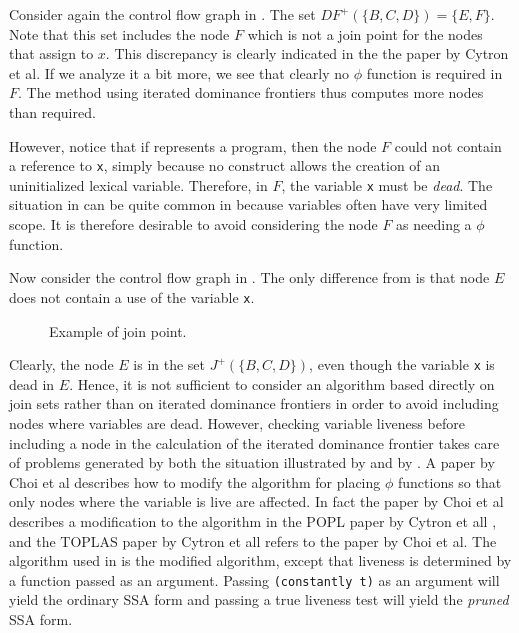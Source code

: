 Consider again the control flow graph in .  The
set $DF^+(\{B, C, D\}) = \{E, F\}$.  Note that this set includes the
node $F$ which is not a join point for the nodes that assign to $x$.
This discrepancy is clearly indicated in the the paper by Cytron et
al.  If we analyze it a bit more, we see that clearly no $\phi$
function is required in $F$.  The method using iterated dominance
frontiers thus computes more nodes than required.  

However, notice that if  represents a
\commonlisp{} program, then the node $F$ could not contain a reference
to \texttt{x}, simply because no \commonlisp{} construct allows the
creation of an uninitialized lexical variable.  Therefore, in $F$, the
variable \texttt{x} must be \emph{dead}.  The situation in
 can be quite common in \commonlisp{} because
variables often have very limited scope.  It is therefore desirable to
avoid considering the node $F$ as needing a $\phi$ function.

Now consider the control flow graph in .  The
only difference from  is that node $E$ does not
contain a use of the variable \texttt{x}.

\begin{figure}
\begin{center}
\end{center}
\caption{\label{fig-ssa-join-2}
Example of join point.}
\end{figure}

Clearly, the node $E$ is in the set $J^+(\{B, C, D\})$, even though
the variable \texttt{x} is dead in $E$.  Hence, it is not sufficient
to consider an algorithm based directly on join sets rather than on
iterated dominance frontiers in order to avoid including nodes where
variables are dead.  However, checking variable liveness before
including a node in the calculation of the iterated dominance frontier
takes care of problems generated by both the situation illustrated by
 and by .  A paper by
Choi et al \cite{Choi:1991:ACS:99583.99594} describes how to modify
the algorithm for placing $\phi$ functions so that only nodes where
the variable is live are affected.  In fact the paper by Choi et al
describes a modification to the algorithm in the POPL paper by Cytron
et all \cite{Cytron:1989:EMC:75277.75280}, and the TOPLAS paper by
Cytron et all \cite{Cytron:1991:ECS:115372.115320} refers to the paper
by Choi et al.  The algorithm used in \sysname{} is the modified
algorithm, except that liveness is determined by a function passed as
an argument.  Passing \texttt{(constantly t)} as an argument will
yield the ordinary SSA form and passing a true liveness test will
yield the \emph{pruned} SSA form.


